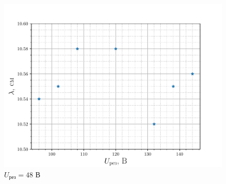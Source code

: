 \begin{figure}[H]
		\centering
		\includegraphics[height=0.4\textheight]{fig/ref48V_2}
		\caption{$U_{\text{рез}}=48$ В}
		\label{fig:ref48V_2}
\end{figure}

